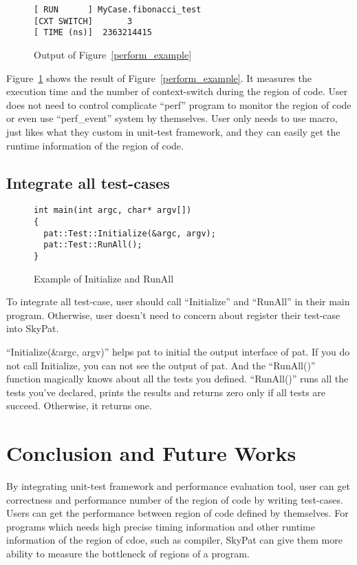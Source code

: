 \documentclass[final]{ols}
\begin{document}
\begin{figure}[h]
\lstset{language=sh}
\begin{lstlisting}[frame=single]
[ RUN      ] MyCase.fibonacci_test
[CXT SWITCH]       3
[ TIME (ns)]  2363214415
\end{lstlisting}
\caption{Output of Figure~\ref{perform_example}}
\label{perform_example_output}
\end{figure}

Figure~\ref{perform_example_output} shows the result of Figure~\ref{perform_example}.
It measures the execution time and the number of context-switch during the region of code.
User does not need to control complicate ``perf'' program to monitor the region of code or even use ``perf\_event'' system by themselves.
User only needs to use macro, just likes what they custom in unit-test framework, and they can easily get the runtime information of the region of code.

\subsection{Integrate all test-cases}

\begin{figure}[h]
\lstset{language=C++}
\begin{lstlisting}[frame=single]
int main(int argc, char* argv[])
{
  pat::Test::Initialize(&argc, argv);
  pat::Test::RunAll();
}
\end{lstlisting}
\caption{Example of Initialize and RunAll}
\label{main_example}
\end{figure}

To integrate all test-case, user should call ``Initialize'' and ``RunAll'' in their main program.
Otherwise, user doesn't need to concern about register their test-case into SkyPat.

``Initialize(\&argc, argv)'' helps pat to initial the output interface of pat. If you do not call Initialize, you can not see the output of pat.
And the ``RunAll()'' function magically knows about all the tests you defined. 
``RunAll()'' runs all the tests you've declared, prints the results and returns zero only if all tests are succeed. Otherwise, it returns one. 

\section{Conclusion and Future Works}
By integrating unit-test framework and performance evaluation tool, user can get correctness and performance number of the region of code by writing test-cases.
Users can get the performance between region of code defined by themselves.
For programs which needs high precise timing information and other runtime information of the region of cdoe, such as compiler, SkyPat can give them more ability to measure the bottleneck of regions of a program.
\end{document}
